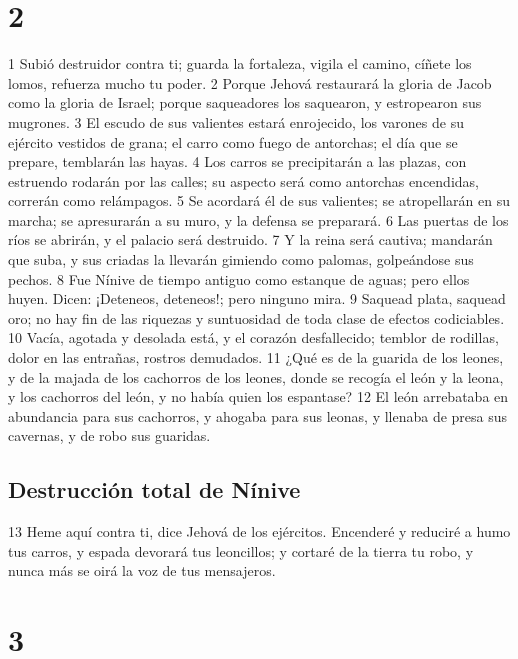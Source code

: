 \chapter{2}

1 Subió destruidor contra ti; guarda la fortaleza, vigila el camino, cíñete los lomos, refuerza mucho tu poder.
2 Porque Jehová restaurará la gloria de Jacob como la gloria de Israel; porque saqueadores los saquearon, y estropearon sus mugrones.
3 El escudo de sus valientes estará enrojecido, los varones de su ejército vestidos de grana; el carro como fuego de antorchas; el día que se prepare, temblarán las hayas.
4 Los carros se precipitarán a las plazas, con estruendo rodarán por las calles; su aspecto será como antorchas encendidas, correrán como relámpagos.
5 Se acordará él de sus valientes; se atropellarán en su marcha; se apresurarán a su muro, y la defensa se preparará.
6 Las puertas de los ríos se abrirán, y el palacio será destruido.
7 Y la reina será cautiva; mandarán que suba, y sus criadas la llevarán gimiendo como palomas, golpeándose sus pechos.
8 Fue Nínive de tiempo antiguo como estanque de aguas; pero ellos huyen. Dicen: ¡Deteneos, deteneos!; pero ninguno mira.
9 Saquead plata, saquead oro; no hay fin de las riquezas y suntuosidad de toda clase de efectos codiciables.
10 Vacía, agotada y desolada está, y el corazón desfallecido; temblor de rodillas, dolor en las entrañas, rostros demudados.
11 ¿Qué es de la guarida de los leones, y de la majada de los cachorros de los leones, donde se recogía el león y la leona, y los cachorros del león, y no había quien los espantase?
12 El león arrebataba en abundancia para sus cachorros, y ahogaba para sus leonas, y llenaba de presa sus cavernas, y de robo sus guaridas.

\section*{Destrucción total de Nínive}

13 Heme aquí contra ti, dice Jehová de los ejércitos. Encenderé y reduciré a humo tus carros, y espada devorará tus leoncillos; y cortaré de la tierra tu robo, y nunca más se oirá la voz de tus mensajeros.

\chapter{3}

